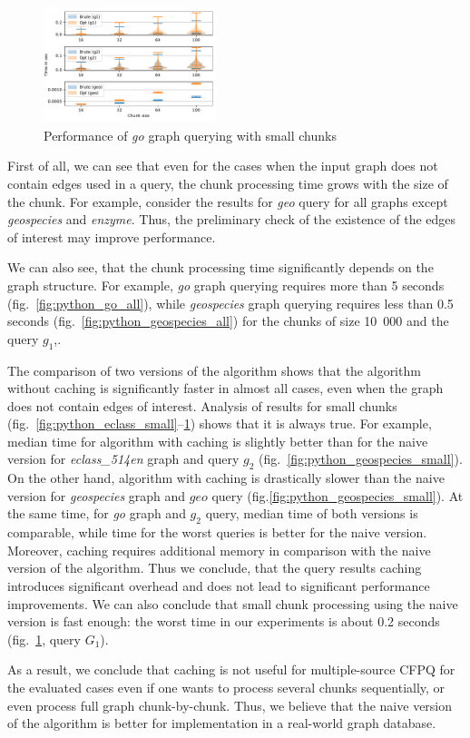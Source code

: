 \begin{figure}[h]
\centering
\includegraphics[width=0.45\textwidth]{data/raw/go_4.pdf}
\caption{Performance of \textit{go} graph querying with small chunks}
\label{fig:python_go_small}
\end{figure}


First of all, we can see that even for the cases when the input graph does not contain edges used in a query, the chunk processing time grows with the size of the chunk.
For example, consider the results for \textit{geo} query for all graphs except \textit{geospecies} and \textit{enzyme}.
Thus, the preliminary check of the existence of the edges of interest may improve performance.

We can also see, that the chunk processing time significantly depends on the graph structure.
For example, \textit{go} graph querying requires more than 5 seconds (fig.~\ref{fig:python_go_all}), while \textit{geospecies} graph querying requires less than 0.5 seconds (fig.~\ref{fig:python_geospecies_all}) for the chunks of size 10~000 and the query $g_1$,.

The comparison of two versions of the algorithm shows that the algorithm without caching is significantly faster in almost all cases, even when the graph does not contain edges of interest.
Analysis of results for small chunks (fig.~\ref{fig:python_eclass_small}--\ref{fig:python_go_small}) shows that it is always true.
For example, median time for algorithm with caching is slightly better than for the naive version for \textit{eclass\_514en} graph and query $g_2$ (fig.~\ref{fig:python_geospecies_small}).
On the other hand, algorithm with caching is drastically slower than the naive version for \textit{geospecies} graph and $geo$ query (fig.\ref{fig:python_geospecies_small}).
At the same time, for \textit{go} graph and $g_2$ query, median time of both versions is comparable, while time for the worst queries is better for the naive version.
Moreover, caching requires additional memory in comparison with the naive version of the algorithm.
Thus we conclude, that the query results caching introduces significant overhead and does not lead to significant performance improvements.
We can also conclude that small chunk processing using the naive version is fast enough: the worst time in our experiments is about 0.2 seconds (fig.~\ref{fig:python_go_small}, query $G_1$).


As a result, we conclude that caching is not useful for multiple-source CFPQ for the evaluated cases even if one wants to process several chunks sequentially, or even process full graph chunk-by-chunk.
Thus, we believe that the naive version of the algorithm is better for implementation in a real-world graph database.



